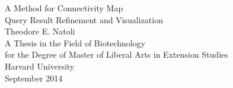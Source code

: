\documentclass[12pt]{article}
\begin{document}

\begin{titlepage}
\begin{center}
A Method for Connectivity Map\\
Query Result Refinement and Visualization\\[\baselineskip]
Theodore E. Natoli\\[\baselineskip]
A Thesis in the Field of Biotechnology\\
for the Degree of Master of Liberal Arts in Extension Studies\\[\baselineskip]
Harvard University\\[\baselineskip]
September 2014\\[\baselineskip]
\end{center}
\newpage
\mbox{}
\end{titlepage}

\end{document}
